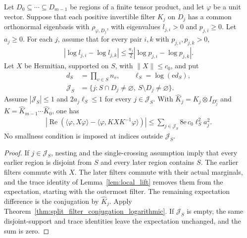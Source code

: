 \begin{theorem}
    \label{thm:chain_term_conjugation_logarithmic}
    \leanok
    Let $D_0\subseteq\cdots\subseteq D_{m-1}$ be regions of a finite
    tensor product, and let $\varphi$ be a unit vector. Suppose that
    each positive invertible filter $K_j$ on $D_j$ has a common
    orthonormal eigenbasis with $\rho_{\varphi,D_j}$, with eigenvalues
    $l_{j,i}>0$ and $p_{j,i}\ge0$. Let $a_j\ge0$. For each $j$,
    assume that for every pair $i,k$ with $p_{j,i},p_{j,k}>0$,
    \begin{align*}
        |\log l_{j,i}-\log l_{j,k}|
        \le\frac{a_j}{2}|\log p_{j,i}-\log p_{j,k}|.
    \end{align*}
    Let $X$ be Hermitian, supported on $S$, with
    $\lVert X\rVert\le c_0$, and put
    \begin{align*}
        d_S          & =\prod_{v\in S}n_v,\qquad \ell_S=\log(\mathrm e d_S), \\
        \mathcal J_S & =\{j:S\cap D_j\ne\varnothing,
        \ S\setminus D_j\ne\varnothing\}.
    \end{align*}
    Assume $|\mathcal J_S|\le1$ and
    $2a_j\ell_S\le1$ for every $j\in\mathcal J_S$.
    With $\widehat K_j=K_j\otimes I_{D_j^c}$ and
    $K=\widehat K_{m-1}\cdots\widehat K_0$, one has
    \begin{align*}
        \left|\operatorname{Re}\left(
        \langle\varphi,X\varphi\rangle
        -\langle\varphi,KXK^{-1}\varphi\rangle
        \right)\right|
        \le\sum_{j\in\mathcal J_S}
        8\mathrm e\,c_0\ell_S^2a_j^2.
    \end{align*}
    No smallness condition is imposed at indices outside
    $\mathcal J_S$.
\end{theorem}
\begin{proof}\leanok
    If $j\in\mathcal J_S$, nesting and the single-crossing assumption
    imply that every earlier region is disjoint from $S$ and every
    later region contains $S$. The earlier filters commute with $X$.
    The later filters commute with their actual marginals, and the
    trace identity of Lemma~\ref{lem:local_lift} removes them from
    the expectation, starting with the outermost filter. The remaining
    expectation difference is the conjugation by $\widehat K_j$.
    Apply Theorem~\ref{thm:split_filter_conjugation_logarithmic}.
    If $\mathcal J_S$ is empty, the same disjoint-support and trace
    identities leave the expectation unchanged, and the sum is zero.
\end{proof}

